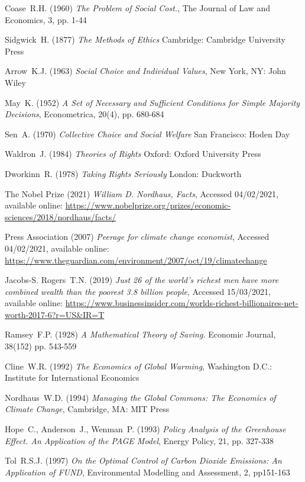 \documentclass[11pt, oneside]{book}   	%
\begin{document}
\begin{thebibliography}{99}
 Coase~R.H. (1960)
\emph{The Problem of Social Cost.},
The Journal of Law and Economics, 3, pp. 1-44
	
 Sidgwick~H. (1877)
\emph{The Methods of Ethics}
Cambridge: Cambridge University Press
	
 Arrow~K.J. (1963)
\emph{Social Choice and Individual Values},
New York, NY: John Wiley
	
 May~K. (1952)
\emph{A Set of Necessary and Sufficient Conditions for Simple Majority Decisions},
Econometrica, 20(4), pp. 680-684
	
 Sen~A. (1970)
\emph{Collective Choice and Social Welfare}
San Francisco: Hoden Day
	
 Waldron~J. (1984)
\emph{Theories of Rights}
Oxford: Oxford University Press
	
 Dworkinn~R. (1978)
\emph{Taking Rights Seriously}
London: Duckworth
	
 The Nobel Prize (2021)
\emph{William D. Nordhaus, Facts},
Accessed 04/02/2021, available online: 
\url{https://www.nobelprize.org/prizes/economic-sciences/2018/nordhaus/facts/}
	
 Press Association (2007)
\emph{Peerage for climate change economist},
Accessed 04/02/2021, available online: 
\url{https://www.theguardian.com/environment/2007/oct/19/climatechange}
	
 Jacobs-S. Rogers~T.N. (2019)
\emph{Just 26 of the world's richest men have more combined wealth than the poorest 3.8 billion people},
Accessed 15/03/2021, available online: 
\url{https://www.businessinsider.com/worlds-richest-billionaires-net-worth-2017-6?r=US&IR=T}
	
 Ramsey~F.P. (1928)
\emph{A Mathematical Theory of Saving.}
Economic Journal, 38(152) pp. 543-559
	
 Cline~W.R. (1992)
\emph{The Economics of Global Warming},
Washington D.C.: Institute for International Economics
	
 Nordhaus~W.D. (1994)
\emph{Managing the Global Commons: The Economics of Climate Change},
Cambridge, MA: MIT Press
	
 Hope~C., Anderson~J., Wenman~P. (1993)
\emph{Policy Analysis of the Greenhouse Effect. An Application of the PAGE Model},
Energy Policy, 21, pp. 327-338
	
 Tol~R.S.J. (1997)
\emph{On the Optimal Control of Carbon Dioxide Emissions: An Application of FUND},
Environmental Modelling and Assessment, 2, pp151-163
	

\end{thebibliography}
\end{document}
